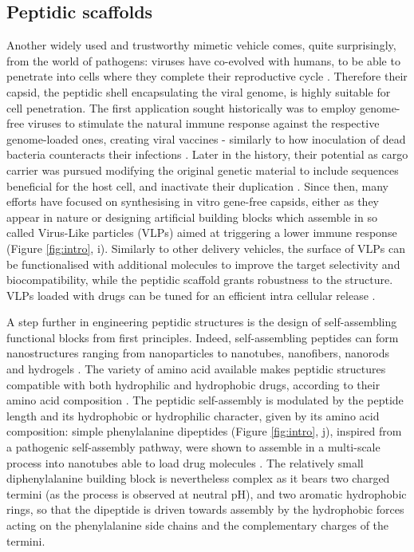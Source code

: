 \subsection{Peptidic scaffolds} \label{sec:peptidic_delivery}
Another widely used and trustworthy mimetic vehicle comes, quite surprisingly, from the world of pathogens: viruses have co-evolved with humans, to be able to penetrate into cells where they complete their reproductive cycle \citep{Lobo2009}. Therefore their capsid, the peptidic shell encapsulating the viral genome, is highly suitable for cell penetration. The first application sought historically was to employ genome-free viruses to stimulate the natural immune response against the respective genome-loaded ones, creating viral vaccines - similarly to how inoculation of dead bacteria counteracts their infections \citep{Lauer2017}.
Later in the history, their potential as cargo carrier was pursued modifying the original genetic material to include sequences beneficial for the host cell, and inactivate their duplication \citep{Daya2008}.
%
Since then, many efforts have focused on synthesising in vitro gene-free capsids, either as they appear in nature \citep{Wu2009} or designing artificial building blocks which assemble in so called Virus-Like particles (VLPs) \citep{Schoonen2014} aimed at triggering a lower immune response (Figure \ref{fig:intro}, i).
%
Similarly to other delivery vehicles, the surface of VLPs can be functionalised with additional molecules to improve the target selectivity and biocompatibility, while the peptidic scaffold grants robustness to the structure. VLPs loaded with drugs can be tuned for an efficient intra cellular release \citep{Ma2012}.

A step further in engineering peptidic structures is the design of self-assembling functional blocks from first principles. Indeed, self-assembling peptides can form nanostructures ranging from nanoparticles to nanotubes, nanofibers, nanorods and hydrogels \citep{Fan2017}.
%
The variety of amino acid available makes peptidic structures compatible with both hydrophilic and hydrophobic drugs, according to their amino acid composition \citep{Ma2012}.
%
The peptidic self-assembly is modulated by the peptide length and its hydrophobic or hydrophilic character, given by its amino acid composition: simple phenylalanine dipeptides (Figure \ref{fig:intro}, j), inspired from a pathogenic self-assembly pathway, were shown to assemble in a multi-scale process into nanotubes able to load drug molecules \citep{Silva2013}. The relatively small diphenylalanine building block is nevertheless complex as it bears two charged termini (as the process is observed at neutral pH), and two aromatic hydrophobic rings, so that the dipeptide is driven towards assembly by the hydrophobic forces acting on the phenylalanine side chains and the complementary charges of the termini.

